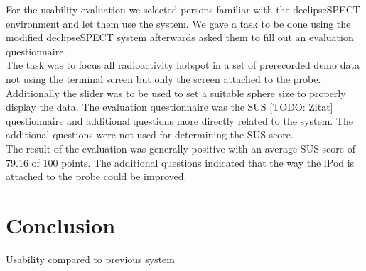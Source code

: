 \documentclass{scrartcl}
\begin{document}
%

For the usability evaluation we selected persons familiar with the declipseSPECT environment and let them use the system. We gave a task to be done using the modified declipseSPECT system afterwards asked them to fill out an evaluation questionnaire.\\
The task was to focus all radioactivity hotspot in a set of prerecorded demo data not using the terminal screen but only the screen attached to the probe. Additionally the slider was to be used to set a suitable sphere size to properly display the data. The evaluation questionnaire was the SUS [TODO: Zitat] questionnaire and additional questions more directly related to the system. The additional questions were not used for determining the SUS score.\\
The result of the evaluation was generally positive with an average SUS score of 79.16 of 100 points. The additional questions indicated that the way the iPod is attached to the probe could be improved.

\section{Conclusion}


Usability compared to previous system\\



\end{document}

